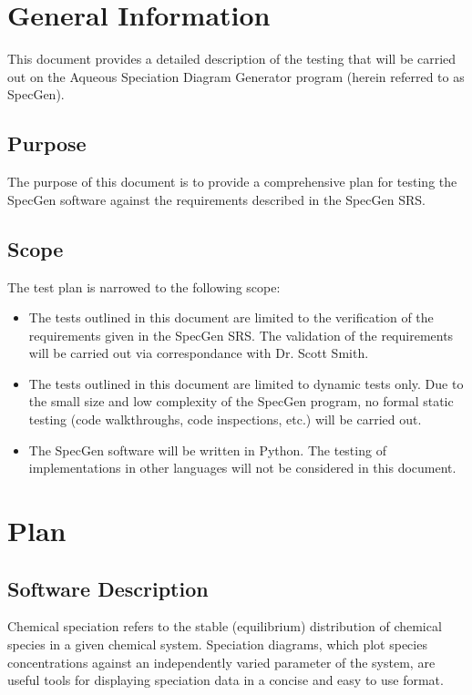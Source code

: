 \documentclass[12pt, titlepage]{article}
\newcommand{\progname}{SpecGen}
\begin{document}
\setcounter{secnumdepth}{3}

\section{General Information}

This document provides a detailed description of the testing that will be 
carried out on the Aqueous Speciation Diagram Generator program (herein referred 
to as \progname{}).  

\subsection{Purpose}
The purpose of this document is to provide a comprehensive plan for testing the 
\progname{} software against the requirements described in the \progname{} SRS.

\subsection{Scope}
The test plan is narrowed to the following scope:
\begin{itemize}
\item The tests outlined in this document are limited to the verification of the 
  requirements given in the \progname{} SRS.  The validation of the requirements 
  will be carried out via correspondance with Dr. Scott Smith.
\item The tests outlined in this document are limited to dynamic tests only.  
  Due to the small size and low complexity of the \progname{} program, no formal
  static testing (code walkthroughs, code inspections, etc.) will be carried out.
\item The \progname{} software will be written in Python.  The testing of 
  implementations in other languages will not be considered in this document.
\end{itemize}

\section{Plan}
\label{SecPlan}
	
\subsection{Software Description}
Chemical speciation refers to the stable (equilibrium) distribution of chemical 
species in a given chemical system.   Speciation diagrams, which plot species 
concentrations against an independently varied parameter of the system, are 
useful tools for displaying speciation data in a concise and easy to use format.  
\end{document}
